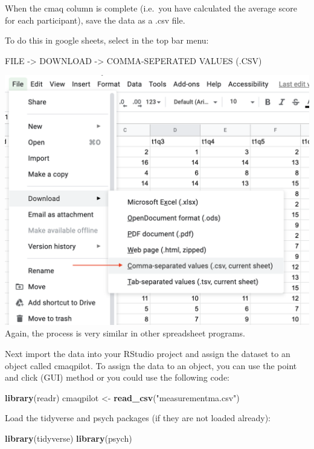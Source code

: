 \documentclass[
]{book}
\newenvironment{Shaded}{\begin{snugshade}}{\end{snugshade}}
\newcommand{\KeywordTok}[1]{\textcolor[rgb]{0.13,0.29,0.53}{\textbf{#1}}}
\newcommand{\NormalTok}[1]{#1}
\newcommand{\StringTok}[1]{\textcolor[rgb]{0.31,0.60,0.02}{#1}}
\begin{document}
When the cmaq column is complete (i.e.~you have calculated the average score for each participant), save the data as a .csv file.

To do this in google sheets, select in the top bar menu:

FILE -\textgreater{} DOWNLOAD -\textgreater{} COMMA-SEPERATED VALUES (.CSV)

\includegraphics{img/savecsv.png}
Again, the process is very similar in other spreadsheet programs.

Next import the data into your RStudio project and assign the dataset to an object called cmaqpilot. To assign the data to an object, you can use the point and click (GUI) method or you could use the following code:

\begin{Shaded}
\begin{Highlighting}[]
\KeywordTok{library}\NormalTok{(readr)}
\NormalTok{cmaqpilot <-}\StringTok{ }\KeywordTok{read_csv}\NormalTok{(}\StringTok{"measurementma.csv"}\NormalTok{)}
\end{Highlighting}
\end{Shaded}

Load the tidyverse and psych packages (if they are not loaded already):

\begin{Shaded}
\begin{Highlighting}[]
\KeywordTok{library}\NormalTok{(tidyverse)}
\KeywordTok{library}\NormalTok{(psych)}
\end{Highlighting}
\end{Shaded}
\end{document}
